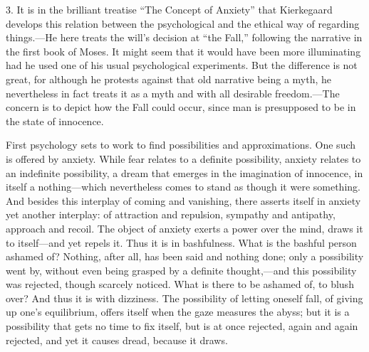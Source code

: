 \documentclass[12pt,a4paper]{book}
\newcommand{\opage}[1]{\marginnote{\footnotesize\textit{[#1]}}}
\begin{document}
3. It is in the brilliant treatise ``The Concept of Anxiety'' that
Kierkegaard develops this relation between the psychological and the
ethical way of regarding things.---He here treats the will's decision at
``the Fall,'' following the
\opage{75}narrative in the first book of Moses. It might seem that it would have
been more illuminating had he used one of his usual psychological
experiments. But the difference is not great, for although he protests
against that old narrative being a myth, he nevertheless in fact treats
it as a myth and with all desirable freedom.---The concern is to depict
how the Fall could occur, since man is presupposed to be in the state of
innocence.

First psychology sets to work to find possibilities and approximations.
One such is offered by anxiety. While fear relates to a definite
possibility, anxiety relates to an indefinite possibility, a dream that
emerges in the imagination of innocence, in itself a nothing---which
nevertheless comes to stand as though it were something. And besides
this interplay of coming and vanishing, there asserts itself in anxiety
yet another interplay: of attraction and repulsion, sympathy and
antipathy, approach and recoil. The object of anxiety exerts a power over
the mind, draws it to itself---and yet repels it. Thus it is in
bashfulness. What is the bashful person ashamed of? Nothing, after all,
has been said and nothing done; only a possibility went by, without even
being grasped by a definite thought,---and this possibility was rejected,
though scarcely noticed. What is there to be ashamed of, to blush over?
And thus it is with dizziness. The possibility of letting oneself fall,
of giving up one's equilibrium, offers itself when the gaze measures the
abyss; but it is a possibility that gets no time to fix itself, but is at
once rejected, again and again rejected, and yet it causes dread, because
it draws.
\end{document}

